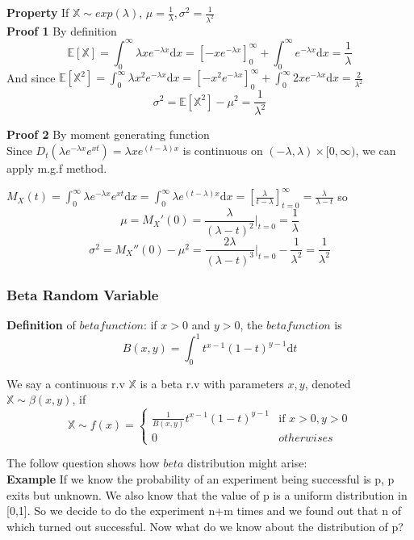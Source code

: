 \documentclass[a4paper,12pt]{article}
\begin{document}
\textbf{Property} If $\mathbb{X} \sim exp(\lambda)$, $\mu = \frac{1}{\lambda}, \sigma^2 = \frac{1}{\lambda^2}$\\

\textbf{Proof 1} By definition\\
$$\mathbb{E}[\mathbb{X}] = \int_0^\infty \lambda x e^{-\lambda x} \mathrm{d}x = [-xe^{-\lambda x}]_0^\infty + \int_0^\infty e^{-\lambda x} \mathrm{d}x = \frac{1}{\lambda}$$
And since $\mathbb{E}[\mathbb{X}^2] = \int_0^\infty \lambda x^2 e^{-\lambda x} \mathrm{d}x = [-x^2e^{-\lambda x}]_0^\infty + \int_0^\infty 2xe^{-\lambda x} \mathrm{d}x = \frac{2}{\lambda^2}$
$$\sigma^2 = \mathbb{E}[\mathbb{X}^2] - \mu^2 = \frac{1}{\lambda^2}$$


\textbf{Proof 2} By moment generating function\\
Since $D_t (\lambda e^{-\lambda x} e^{xt}) = \lambda x e^{(t-\lambda) x}$ is continuous on $(-\lambda, \lambda ) \times [0, \infty)$, we can apply m.g.f method.

$M_X(t) = \int_0^\infty \lambda e^{-\lambda x} e^{xt} \mathrm{d}x = \int_0^\infty \lambda e^{(t-\lambda) x} \mathrm{d}x = [\frac{\lambda}{t-\lambda}]_{t = 0}^\infty = \frac{\lambda}{\lambda - t}$ so
$$\mu = M_X'(0) = \frac{\lambda}{(\lambda - t)^2} |_{t=0} = \frac{1}{\lambda}$$
$$\sigma^2 = M_X''(0) - \mu^2 = \frac{2\lambda}{(\lambda - t)^3} |_{t=0} - \frac{1}{\lambda^2} = \frac{1}{\lambda^2}$$


\subsubsection{Beta Random Variable}
\textbf{Definition} of $beta function$: if $x>0$ and $y>0$, the $beta function$ is
$$B(x, y) = \int_0^1 t^{x-1}(1-t)^{y-1}\mathrm{d}t$$ 

We say a continuous r.v $\mathbb{X}$ is a beta r.v with parameters $x, y$, denoted $\mathbb{X} \sim \beta(x, y)$, if
$$
 \mathbb{X} \sim f(x) =
  \begin{cases}
   \frac{1}{B(x, y)} t^{x-1} (1-t)^{y-1} & \text{if } x > 0, y>0 \\
   0       & otherwises
  \end{cases}
$$

The follow question shows how $beta$ distribution might arise:\\

\textbf{Example} If we know the probability of an experiment being successful is p, p exits but unknown. We also know that the value of p is a uniform distribution in [0,1]. So we decide to do the experiment n+m times and we found out that n of which turned out successful. Now what do we know about the distribution of p?\\
\end{document}

